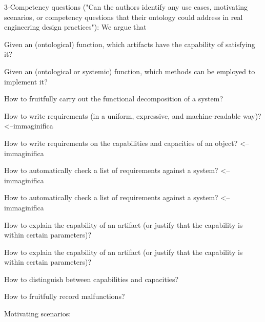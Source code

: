\documentclass[sw]{iosart2x}
\newcommand{\bflist}{\begin{list}{}{\setlength{\topsep}{2mm}\setlength{\partopsep}{0mm}\setlength{\parsep}{0mm}\setlength{\leftmargin}{9mm}\setlength{\labelwidth}{8mm}}}
\newcommand{\eflist}{\end{list}}
\newcommand{\CQLabel}{\textrm{CQ}}
\newcounter{cntCQ}
\newcommand{\myCQ}[1]{\refstepcounter{cntCQ}\begin{small}{\bf \CQLabel\thecntCQ\label{CQ:#1}}\end{small}}
\begin{document}
{3-Competency questions ("Can the authors identify any use cases, motivating scenarios, or competency questions that their ontology could address in real engineering design practices"):
We argue that 
\bflist
  \item[\myCQ{cq2}] Given an (ontological) function, which artifacts have the capability of satisfying it?
  \item[\myCQ{cq3}] Given an (ontological or systemic) function, which methods can be employed to implement it?
  \item[\myCQ{cq4}] How to fruitfully carry out the functional decomposition of a system?
  \item[\myCQ{cq5.1}] How to write requirements (in a uniform, expressive, and machine-readable way)? <--immaginifica
  \item[\myCQ{cq5.2}] How to write requirements on the capabilities and capacities of an object? <--immaginifica
  \item[\myCQ{cq6}] How to automatically check a list of requirements against a system? <--immaginifica
  \item[\myCQ{cq7}] How to automatically check a list of requirements against a system? <--immaginifica
  \item[\myCQ{cq8}] How to explain the capability of an artifact (or justify that the capability is within certain parameters)?
  \item[\myCQ{cq8.2}] How to explain the capability of an artifact (or justify that the capability is within certain parameters)?
  \item[\myCQ{cq8.3}] How to distinguish between capabilities and capacities?
  \item[\myCQ{cq9}] How to fruitfully record malfunctions?
\eflist

Motivating scenarios:
}
\end{document}
